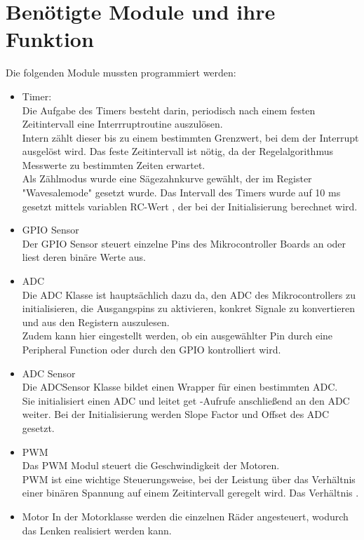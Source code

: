 \documentclass[a4paper,10pt,twoside]{report}
\begin{document}
\section{Benötigte Module und ihre Funktion}
Die folgenden Module mussten programmiert werden:
\begin{itemize}
\item Timer:\\
Die Aufgabe des Timers besteht darin, periodisch nach einem festen Zeitintervall eine Interrruptroutine auszulösen.\\ Intern zählt dieser bis zu einem bestimmten Grenzwert, bei dem der Interrupt ausgelöst wird. Das feste Zeitintervall ist nötig, da der Regelalgorithmus Messwerte zu bestimmten Zeiten erwartet.\\
Als Zählmodus wurde eine Sägezahnkurve gewählt, der im Register "Wavesalemode" gesetzt wurde. Das Intervall des Timers wurde auf 10 ms gesetzt mittels variablen RC-Wert , der bei der Initialisierung berechnet wird.
\item GPIO Sensor\\
Der GPIO Sensor steuert einzelne Pins des Mikrocontroller Boards an oder liest deren binäre Werte aus.
\item ADC\\
Die ADC Klasse ist hauptsächlich dazu da, den ADC des Mikrocontrollers zu initialisieren, die Ausgangspins zu aktivieren, konkret Signale zu konvertieren und aus den Registern auszulesen.\\ 
Zudem kann hier eingestellt werden, ob ein ausgewählter Pin durch eine Peripheral Function oder durch den GPIO kontrolliert wird.
\item ADC Sensor\\
Die ADCSensor Klasse bildet einen Wrapper für einen bestimmten ADC.\\
Sie initialisiert einen ADC und leitet get -Aufrufe anschließend an den ADC weiter. Bei der Initialisierung werden Slope Factor und Offset des ADC gesetzt.\\
\item PWM\\
Das PWM Modul steuert die Geschwindigkeit der Motoren.\\
PWM ist eine wichtige Steuerungsweise, bei der Leistung über das Verhältnis einer binären Spannung auf einem Zeitintervall geregelt wird.
Das Verhältnis .
\item Motor
In der Motorklasse werden die einzelnen Räder angesteuert, wodurch das Lenken realisiert werden kann. 

\end{itemize}
\end{document}
